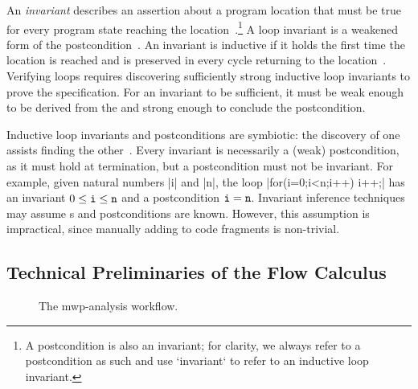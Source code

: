An \emph{invariant} describes an assertion about a program location that must be true for every program state reaching the location~\cite{furia2010,nguyen2022}.\footnote{A postcondition is also an invariant; for clarity, we always refer to a postcondition as such and use `invariant` to refer to an inductive loop invariant.}
A {loop invariant} is a weakened form of the postcondition~\cite{furia2010}.
An invariant is {inductive} if it holds the first time the location is reached and is preserved in every cycle returning to the location~\cite{sankaranarayanan2004}.
Verifying loops requires discovering {sufficiently strong} inductive loop invariants to prove the specification.
For an invariant to be sufficient, it must be weak enough to be derived from the  and strong enough to conclude the postcondition.

Inductive loop invariants and postconditions are symbiotic: the discovery of one assists finding the other~\cite{furia2010}.
Every invariant is necessarily a (weak) postcondition, as it must hold at termination, but a postcondition must not be invariant.
For example, given natural numbers \pr|i| and \pr|n|, the loop \prc|for(i=0;i<n;i++) i++;| has an invariant \(0 \leq \prm{i} \leq \prm{n}\) and a postcondition \(\prm{i}=\prm{n}\).
Invariant inference techniques may assume s and postconditions are known.
However, this assumption is impractical, since manually adding  to code fragments is non-trivial.

\subsection{Technical Preliminaries of the Flow Calculus}
\label{sec:calc}

\begin{figure}[H]
\centering
{}

\caption[The mwp-analysis workflow]{The mwp-analysis workflow.}
\label{fig:pc-workflow}
\end{figure}

